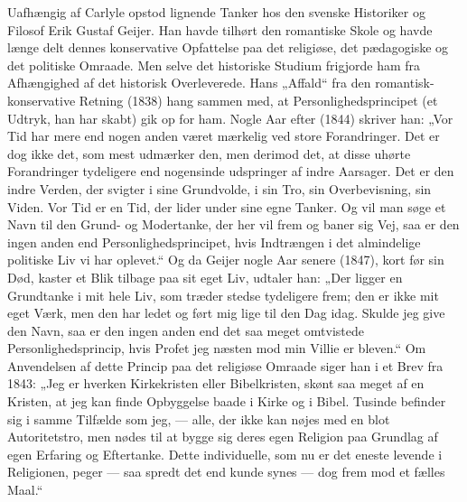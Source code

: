 \documentclass[12pt,a4paper,openany]{book}
\newcommand{\opage}[1]{\marginnote{\footnotesize\textit{[#1]}}}
\begin{document}
Uafhængig af Carlyle opstod lignende Tanker hos den svenske Historiker
og Filosof Erik Gustaf Geijer. Han havde tilhørt den romantiske
Skole og havde længe delt dennes konservative Opfattelse paa
det religiøse, det pædagogiske og det politiske Omraade. Men selve
det historiske Studium frigjorde ham fra Afhængighed af det historisk
Overleverede. Hans „Affald“ fra den romantisk-konservative
Retning (1838) hang sammen med, at Personlighedsprincipet (et Udtryk,
han har skabt) gik op for ham. Nogle Aar efter (1844) skriver
han: „Vor Tid har mere end nogen anden været mærkelig ved store
Forandringer. Det er dog ikke det, som mest udmærker den, men
derimod det, at disse uhørte Forandringer tydeligere end nogensinde
udspringer af indre Aarsager. Det er den indre Verden, der svigter
i sine Grundvolde, i sin Tro, sin Overbevisning, sin Viden. Vor Tid
er en Tid, der lider under sine egne Tanker. Og vil man søge et Navn
til den Grund- og Modertanke, der her vil frem og baner sig Vej, saa
er den ingen anden end Personlighedsprincipet, hvis Indtrængen i det
almindelige politiske Liv vi har oplevet.“ Og da Geijer nogle Aar senere
(1847), kort før sin Død, kaster et Blik tilbage paa sit eget Liv,
\opage{139}udtaler han: „Der ligger en Grundtanke i mit hele Liv, som træder
stedse tydeligere frem; den er ikke mit eget Værk, men den har ledet
og ført mig lige til den Dag idag. Skulde jeg give den Navn, saa er
den ingen anden end det saa meget omtvistede Personlighedsprincip,
hvis Profet jeg næsten mod min Villie er bleven.“ Om Anvendelsen
af dette Princip paa det religiøse Omraade siger han i et Brev fra
1843: „Jeg er hverken Kirkekristen eller Bibelkristen, skønt saa meget
af en Kristen, at jeg kan finde Opbyggelse baade i Kirke og i
Bibel. Tusinde befinder sig i samme Tilfælde som jeg, --- alle, der
ikke kan nøjes med en blot Autoritetstro, men nødes til at bygge sig
deres egen Religion paa Grundlag af egen Erfaring og Eftertanke.
Dette individuelle, som nu er det eneste levende i Religionen, peger
--- saa spredt det end kunde synes --- dog frem mod et fælles Maal.“
\end{document}
